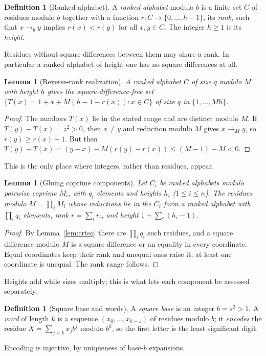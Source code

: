 \documentclass[11pt]{article}
\newtheorem{lemma}[theorem]{Lemma}
\theoremstyle{definition}
\newtheorem{definition}[theorem]{Definition}
\theoremstyle{remark}
\begin{document}
\begin{definition}[Ranked alphabet]\label{def:ranked}
A \emph{ranked alphabet} modulo $b$ is a finite set $C$ of residues modulo $b$
together with a function $r:C\to\{0,\ldots,h-1\}$, its \emph{rank}, such that
$x\to_b y$ implies $r(x)<r(y)$ for all $x,y\in C$. The integer $h\ge1$ is its
\emph{height}.
\end{definition}
Residues without square differences between them may share a rank. In
particular a ranked alphabet of height one has no square differences at all.

\begin{lemma}[Reverse-rank realization]\label{lem:reverse}
A ranked alphabet $C$ of size $q$ modulo $M$ with height $h$ gives the
square-difference-free set $\{T(x)=1+x+M(h-1-r(x)):x\in C\}$ of size $q$ in
$\{1,\ldots,Mh\}$.
\end{lemma}
\begin{proof}
The numbers $T(x)$ lie in the stated range and are distinct modulo $M$.
If $T(y)-T(x)=z^2>0$, then $x\ne y$ and reduction modulo $M$ gives
$x\to_My$, so $r(y)\ge r(x)+1$. But then
$T(y)-T(x)=(y-x)-M(r(y)-r(x))\le(M-1)-M<0$.
\end{proof}
This is the only place where integers, rather than residues, appear.

\begin{lemma}[Gluing coprime components]\label{lem:crt}
Let $C_i$ be ranked alphabets modulo pairwise coprime $M_i$, with $q_i$
elements and heights $h_i$ ($1\le i\le n$). The residues modulo
$M=\prod_iM_i$ whose reductions lie in the $C_i$ form a ranked alphabet with
$\prod_iq_i$ elements, rank $r=\sum_ir_i$, and height $1+\sum_i(h_i-1)$.
\end{lemma}
\begin{proof}
By Lemma~\ref{lem:crtsq} there are $\prod_iq_i$ such residues, and a square
difference modulo $M$ is a square difference or an equality in every
coordinate. Equal coordinates keep their rank and unequal ones raise it; at
least one coordinate is unequal. The rank range follows.
\end{proof}
Heights add while sizes multiply; this is what lets each component be
assessed separately.

\begin{definition}[Square base and words]\label{def:words}
A \emph{square base} is an integer $b=s^2>1$. A \emph{word} of length $k$ is a
sequence $(x_0,\ldots,x_{k-1})$ of residues modulo $b$; it \emph{encodes} the
residue $X=\sum_{j<k}x_jb^j$ modulo $b^k$, so the first letter is the least
significant digit.
\end{definition}
Encoding is injective, by uniqueness of base-$b$ expansions.
\end{document}

